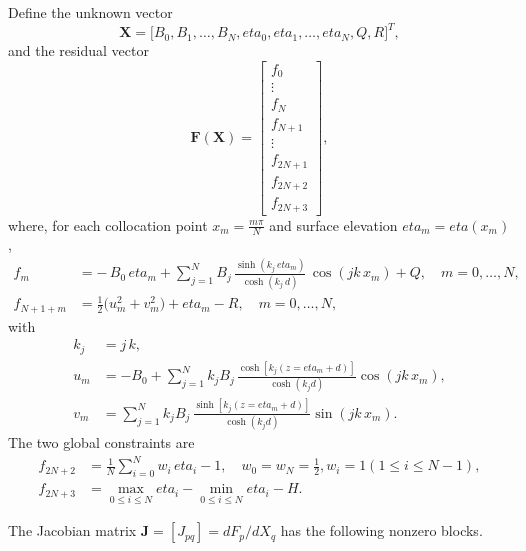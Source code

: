\documentclass[journal,10pt,twocolumn]{IEEEtran}
\def\eta{eta}%
\def\partial{d}%
\def\;{ }%
\begin{document}
    Define the unknown vector
    \[
        \mathbf{X} = \bigl[B_{0}, B_{1},\dots,B_{N},\;\eta_{0},\eta_{1},\dots,\eta_{N},\;Q,\;R\bigr]^{T},
    \]
    and the residual vector
    \[
        \mathbf{F}(\mathbf{X}) =
        \begin{bmatrix}
            f_{0}\\
            \vdots\\
            f_{N}\\[0.5ex]
            f_{N+1}\\
            \vdots\\
            f_{2N+1}\\[0.5ex]
            f_{2N+2}\\
            f_{2N+3}
        \end{bmatrix},
    \]
    where, for each collocation point $x_{m} = \tfrac{m\pi}{N}$ and surface elevation $\eta_{m} = \eta(x_{m})$,
    \begin{align}
        f_{m} &= -\,B_{0}\,\eta_{m}
        + \sum_{j=1}^{N} B_{j}\,\frac{\sinh(k_{j}\,\eta_{m})}{\cosh(k_{j}\,d)}\,\cos(jk\,x_{m})
        + Q,
        \quad m=0,\dots,N,
        \\
        f_{N+1+m} &= \tfrac12\bigl(u_{m}^{2}+v_{m}^{2}\bigr)
        + \eta_{m} - R,
        \quad m=0,\dots,N,
    \end{align}
    with
    \begin{align}
        k_{j} &= j\,k, \\[0.5ex]
        u_{m} &= -B_{0} + \sum_{j=1}^{N} k_{j}B_{j}\,\frac{\cosh[k_{j}(z=\eta_{m}+d)]}{\cosh(k_{j}d)}\cos(jk\,x_{m}),
        \\
        v_{m} &= \sum_{j=1}^{N} k_{j}B_{j}\,\frac{\sinh[k_{j}(z=\eta_{m}+d)]}{\cosh(k_{j}d)}\sin(jk\,x_{m}).
    \end{align}
    The two global constraints are
    \begin{align}
        f_{2N+2} &= \frac{1}{N}\sum_{i=0}^{N} w_i\,\eta_{i} - 1,
        \quad w_{0}=w_{N}=\tfrac12,\;w_{i}=1\;(1\le i\le N-1),
        \\
        f_{2N+3} &= \max_{0\le i\le N}\!\eta_{i}\;-\;\min_{0\le i\le N}\!\eta_{i}\;-\;H.
    \end{align}

    The Jacobian matrix $\mathbf{J} = [J_{pq}]=\partial F_{p}/\partial X_{q}$ has the following nonzero blocks.
\end{document}
